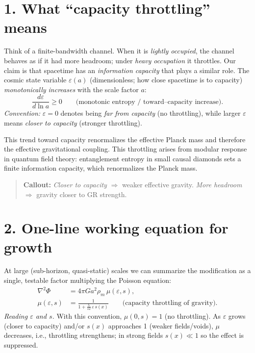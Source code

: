 \documentclass[aps,prd,onecolumn,superscriptaddress,nofootinbib]{revtex4-2}
\newcommand{\eps}{\varepsilon}
\begin{document}
\section*{1. What ``capacity throttling'' means}
Think of a finite-bandwidth channel. When it is \emph{lightly occupied}, the channel behaves as if it had more headroom; under \emph{heavy occupation} it throttles. Our claim is that spacetime has an \emph{information capacity} that plays a similar role. The cosmic state variable $\eps(a)$ (dimensionless; how close spacetime is to capacity) \emph{monotonically increases} with the scale factor $a$:
\[
\frac{d\eps}{d\ln a} \ge 0 \qquad \text{(monotonic entropy / toward--capacity increase).}
\]
\noindent\emph{Convention:} $\eps=0$ denotes being \emph{far from capacity} (no throttling), while larger $\eps$ means \emph{closer to capacity} (stronger throttling).

This trend toward capacity renormalizes the effective Planck mass and therefore the effective gravitational coupling.
This throttling arises from modular response in quantum field theory: entanglement entropy in small causal diamonds sets a finite information capacity, which renormalizes the Planck mass.

\begin{quote}
\textbf{Callout:} \emph{Closer to capacity} $\Rightarrow$ weaker effective gravity. \emph{More headroom} $\Rightarrow$ gravity closer to GR strength.
\end{quote}

\section*{2. One-line working equation for growth}
At large (sub-horizon, quasi-static) scales we can summarize the modification as a single, testable factor multiplying the Poisson equation:
\begin{align}
\nabla^2\Phi &= 4\pi G a^2 \rho_m \,\mu(\eps,s), \\
\mu(\eps,s) &= \frac{1}{1+\frac{5}{12}\,\eps\,s(x)} \qquad \text{(capacity throttling of gravity)}.
\end{align}
\noindent\emph{Reading $\varepsilon$ and $s$.} With this convention, $\mu(0,s)=1$ (no throttling). As $\varepsilon$ grows (closer to capacity) and/or $s(x)$ approaches 1 (weaker fields/voids), $\mu$ decreases, i.e., throttling strengthens; in strong fields $s(x)\ll 1$ so the effect is suppressed.
\end{document}
